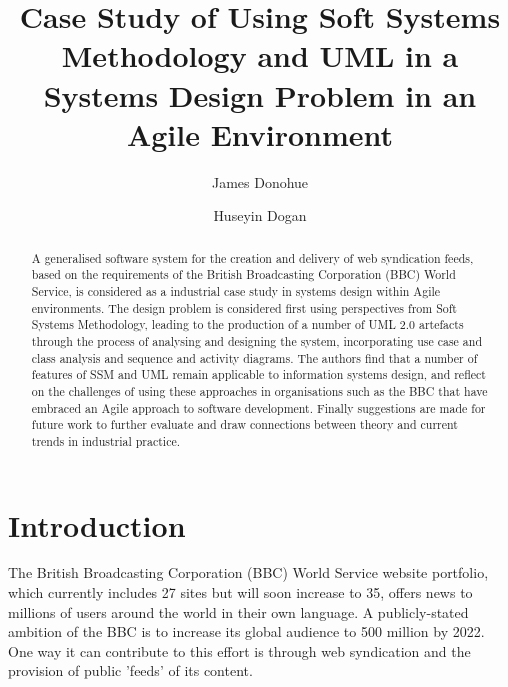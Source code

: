 \documentclass[runningheads,a4paper]{llncs}
\begin{document}
\mainmatter

\title{Case Study of Using Soft Systems Methodology and UML in a Systems Design Problem in an Agile Environment}

\author{James Donohue \and Huseyin Dogan}


\maketitle

\begin{abstract}
A generalised software system for the creation and delivery of web syndication feeds, based on the requirements of the British Broadcasting Corporation (BBC) World Service, is considered as a industrial case study in systems design within Agile environments. The design problem is considered first using perspectives from Soft Systems Methodology, leading to the production of a number of UML 2.0 artefacts through the process of analysing and designing the system, incorporating use case and class analysis and sequence and activity diagrams. The authors find that a number of features of SSM and UML remain applicable to information systems design, and reflect on the challenges of using these approaches in organisations such as the BBC that have embraced an Agile approach to software development. Finally suggestions are made for future work to further evaluate and draw connections between theory and current trends in industrial practice.

\end{abstract}

\section{Introduction}

The British Broadcasting Corporation (BBC) World Service website portfolio, which currently includes 27 sites but will soon increase to 35, offers news to millions of users around the world in their own language. A publicly-stated ambition of the BBC \cite{bbc2013} is to increase its global audience to 500 million by 2022. One way it can contribute to this effort is through web syndication and the provision of public 'feeds' of its content.
\end{document}
